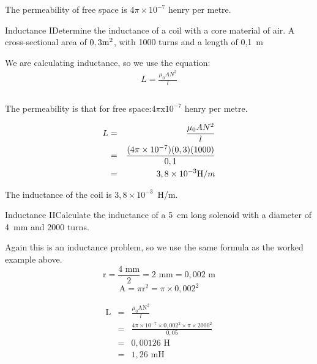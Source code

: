 
\begin{IFact}{The permeability of free space is $4 \pi \times 10^{-7}$ henry per metre.}
\end{IFact}

\begin{wex}{Inductance I}{Determine the inductance of a coil with a core material of air. A cross-sectional area of $0,3\rm{m^2}$, with 1000 turns and a length of 0,1~m}
{
We are calculating inductance, so we use the equation:
\begin{eqnarray*}
L=\frac{\mu_0 A N^2}{l}\\
\end{eqnarray*}\\
The permeability is that for free space:$4 \pi \textrm{x} 10^{-7}$ henry per metre.

\begin{eqnarray*}
L&=&\frac{\mu_0 A N^2}{l}\\
&=&\frac{(4 \pi \times 10^{-7})(0,3)(1000)}{0,1}\\ 
&=&3,8 \times 10^{-3} \textrm H/m\\
\end{eqnarray*}

The inductance of the coil is $3,8\times 10^{-3}$~H/m.}
\end{wex}

\begin{wex}{Inductance II}{Calculate the inductance of a 5~cm long solenoid with a diameter of 4~mm and 2000 turns.
}
{Again this is an inductance problem, so we use the same formula as the worked example above.\\
 
$$\textrm{r} = \frac{4 \textrm{ mm}}{2} = 2 \textrm{ mm} = 0,002 \textrm{ m}$$
$$\textrm{A} = \pi \textrm{r}^2 = \pi \times 0,002^2$$

\begin{eqnarray*}
\textrm{L} & = & \frac{\mu_0 \textrm{A} \textrm{N}^2}{l}\\
& = & \frac{4 \pi \times 10^{-7} \times 0,002^2 \times \pi \times 2000^2}{0,05}\\
& = & 0,00126 \textrm{ H}\\
& = & 1,26\textrm{ mH}\\
\end{eqnarray*}
}

\end{wex}

